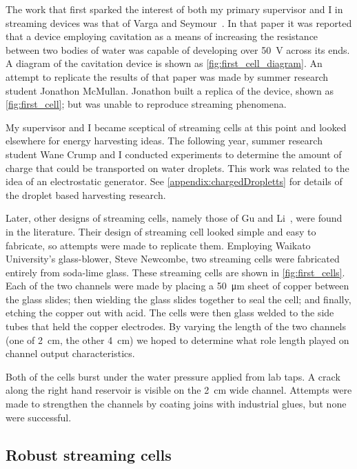     The work that first sparked the interest of both my primary supervisor and I in streaming devices was that of Varga and Seymour~\cite{Varga1986}.
    In that paper it was reported that a device employing cavitation as a means of increasing the resistance between two bodies of  water was capable of developing over \SI{50}{\volt} across its ends.
    A diagram of the cavitation device is shown as \cref{fig:first_cell_diagram}.
    An attempt to replicate the results of that paper was made by summer research student Jonathon McMullan.
    Jonathon built a replica of the device, shown as \cref{fig:first_cell}; but was unable to reproduce streaming phenomena.

    My supervisor and I became sceptical of streaming cells at this point and looked elsewhere for energy harvesting ideas.
    The following year, summer research student Wane Crump and I conducted experiments to determine the amount of charge that could be transported on water droplets.
    This work was related to the idea of an electrostatic generator.
    See \cref{appendix:chargedDropletts} for details of the droplet based harvesting research.

    Later, other designs of streaming cells, namely those of Gu and Li~\cite{Gu2000}, were found in the literature.
    Their design of streaming cell looked simple and easy to fabricate, so attempts were made to replicate them.
    Employing Waikato University's glass-blower, Steve Newcombe, two streaming cells were fabricated entirely from soda-lime glass.
    These streaming cells are shown in \cref{fig:first_cells}.
    Each of the two channels were made by placing a \SI{50}{\micro\meter} sheet of copper between the glass slides; then wielding the glass slides together to seal the cell; and finally, etching the copper out with acid.
    The cells were then glass welded to the side tubes that held the copper electrodes.
    By varying the length of the two channels (one of \SI{2}{\centi\meter}, the other \SI{4}{\centi\meter}) we hoped to determine what role length played on channel output characteristics.

    Both of the cells burst under the water pressure applied from lab taps.
    A crack along the right hand reservoir is visible on the \SI{2}{\centi\meter} wide channel.
    Attempts were made to strengthen the channels by coating joins with industrial glues, but none were successful.


  \subsection{Robust streaming cells}


